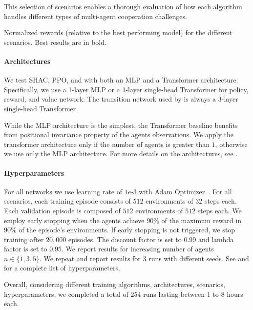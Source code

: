 \noindent This selection of scenarios enables a thorough evaluation of how each algorithm handles different types of multi-agent cooperation challenges.

\begin{table}[t]
    \centering
    
    \caption{Normalized rewards (relative to the best performing model) for the different scenarios. Best results are in bold.}\label{tab:max-rewards}
\end{table}

\paragraph{Architectures}
We test SHAC, PPO, and \fname{} with both an MLP and a Transformer architecture. Specifically, we use a 1-layer MLP or a 1-layer single-head Transformer for policy, reward, and value network. The transition network used by \fname{} is always a 3-layer single-head Transformer

While the MLP architecture is the simplest, the Transformer baseline benefits from positional invariance property of the agents observations. We apply the transformer architecture only if the number of agents is greater than $1$, otherwise we use only the MLP architecture. For more details on the architectures, see .

\paragraph{Hyperparameters}
For all networks we use learning rate of $1e\text{-}3$ with Adam Optimizer~\cite{Kingma14}. For all scenarios, each training episode consists of $512$ environments of $32$ steps each. Each validation episode is composed of $512$ environments of $512$ steps each. We employ early stopping when the agents achieve $90\%$ of the maximum reward in $90\%$ of the episode's environments. If early stopping is not triggered, we stop training after $20,000$ episodes. The discount factor is set to $0.99$ and lambda factor is set to $0.95$. We report results for increasing number of agents $n\in\{1,3,5\}$. We repeat and report results for $3$ runs with different seeds. See  and  for a complete list of hyperparameters.

Overall, considering different training algorithms, architectures, scenarios, hyperparameters, we completed a total of $254$ runs lasting between $1$ to $8$ hours each. 

